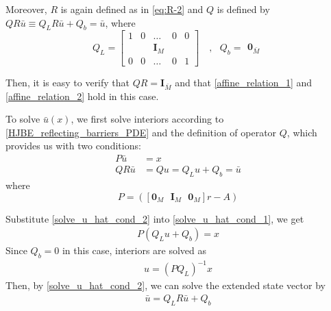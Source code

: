 \documentclass[11pt]{article}
\begin{document}
Moreover, $R$ is again defined as in \eqref{eq:R-2} and $Q$ is defined by $Q R\bar{u}\equiv Q_L R\bar{u}+Q_b = \bar{u}$, where
\begin{equation}
Q_L = \begin{bmatrix}
1& 0&\dots&0&0\\
 & & \mathbf{I}_M & & \\
0&0&\dots&0&1
\end{bmatrix}%
\quad , \text{ } Q_b = \begin{matrix}
\mathbf{0}_{\bar{M}}
\end{matrix}%
\end{equation}

Then, it is easy to verify that $Q  R = \mathbf{I}_{\bar{M}}$ and that \eqref{affine_relation_1} and \eqref{affine_relation_2} hold in this case.

To solve $\bar{u}(x)$, we first solve interiors according to \eqref{HJBE_reflecting_barriers_PDE} and the definition of operator $Q$, which provides us with two conditions:
\begin{align}
P\bar{u} &= x\label{solve_u_hat_cond_1}\\
Q R\bar{u} &= Q u = Q_L u+Q_b = \bar{u}\label{solve_u_hat_cond_2}
\end{align}
where
\begin{equation}
P = ([\mathbf{0}_{M} \text{ } \mathbf{I}_{M} \text{ } \mathbf{0}_{M}] r - A)
\label{P_definition}
\end{equation}
\iffalse
\begin{align}
P &= \begin{bmatrix}
0&r&0&\cdots&0&0&0\\
0&0&r&\cdots&0&0&0\\
\vdots&\vdots&\vdots&\ddots&\vdots&\vdots&\vdots\\
0&0&0&\cdots&r&0&0\\
0&0&0&\cdots&0&r&0\\
\end{bmatrix}_{M\times\bar{M}}-A  \\
&= \begin{bmatrix}
-1&2(1+r\Delta^2)&-1&\dots&0&0&0\\
0&-1&2(1+r\Delta^2)&\dots&0&0&0\\
\vdots&\vdots&\vdots&\ddots&\vdots&\vdots&\vdots\\
0&0&0&\dots&2(1+r\Delta^2)&-1&0\\
0&0&0&\cdots&-1&2(1+r\Delta^2)&-1
\end{bmatrix}\frac{1}{2\Delta^{2}}
\end{align}
\fi
Substitute \eqref{solve_u_hat_cond_2} into \eqref{solve_u_hat_cond_1}, we get
\begin{align}
P(Q_L u+Q_b) = x
\end{align}
Since $Q_b = 0$ in this case, interiors are solved as
\begin{align}
u = (P Q_L)^{-1}x
\end{align}
Then, by \eqref{solve_u_hat_cond_2}, we can solve the extended state vector by
\begin{align}
\bar{u} = Q_L R\bar{u}+Q_b\label{solve_u_hat_in_terms_of_interiors}
\end{align}
\end{document}

